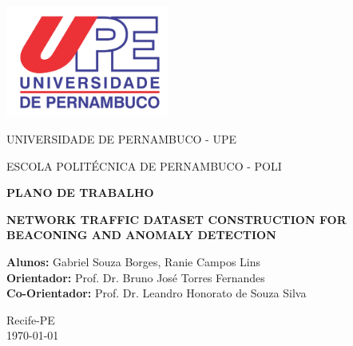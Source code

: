\documentclass[a4paper, 12pt]{article}
\begin{document}
\begin{titlepage}
    \centering
    \includegraphics[width=0.4\textwidth]{upe.png}\par
    \vspace{1.5cm}
    
    {\large UNIVERSIDADE DE PERNAMBUCO - UPE}\par
    \vspace{0.2cm}
    {\large ESCOLA POLITÉCNICA DE PERNAMBUCO - POLI}
    
    \vfill %
    
    {\Large \textbf{PLANO DE TRABALHO}}\par
    
    \vspace{1cm}
    
    {\huge \bfseries NETWORK TRAFFIC DATASET CONSTRUCTION FOR BEACONING AND ANOMALY DETECTION\par}
    
    \vfill %
    
    \begin{flushleft}
    \large
        \textbf{Alunos:} Gabriel Souza Borges, Ranie Campos Lins \\
        \textbf{Orientador:} Prof. Dr. Bruno José Torres Fernandes \\
        \textbf{Co-Orientador:} Prof. Dr. Leandro Honorato de Souza Silva
    \end{flushleft}
    
    \vfill %
    
    \large
    Recife-PE \\
    \today
\end{titlepage}
\end{document}
